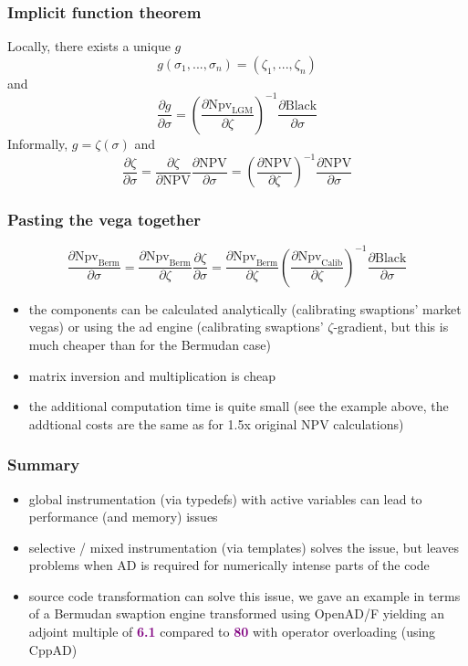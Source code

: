 \documentclass[10pt,German]{beamer}
\begin{document}
\begin{frame}[fragile]
\frametitle{Implicit function theorem}
Locally, there exists a unique $g$
\begin{equation}
g(\sigma_1, ... , \sigma_n) = (\zeta_1, ..., \zeta_n)
\end{equation}
and
\begin{equation}
\frac{\partial g}{\partial \sigma} = \left( \frac{\partial \text{Npv}_{\text{LGM}}}{\partial \zeta} \right) ^ {-1} \frac{\partial \text{Black}}{\partial \sigma}
\end{equation}
Informally, $g = \zeta(\sigma)$ and
\begin{equation}
\frac{\partial \zeta}{\partial \sigma} = \frac{\partial \zeta}{\partial \text{NPV}} \frac{\partial \text{NPV}}{\partial \sigma} = 
\left( \frac{\partial \text{NPV}}{\partial \zeta}\right)^{-1} \frac{\partial \text{NPV}}{\partial \sigma}
\end{equation}
\end{frame}

\begin{frame}[fragile]
\frametitle{Pasting the vega together}
\begin{equation*}
\frac{\partial \text{Npv}_\text{Berm}}{\partial \sigma} = \frac{\partial \text{Npv}_\text{Berm}}{\partial \zeta} \frac{\partial \zeta}{\partial \sigma} = \frac{\partial \text{Npv}_\text{Berm}}{\partial \zeta} \left( \frac{\partial \text{Npv}_\text{Calib}}{\partial \zeta} \right) ^ {-1} \frac{\partial \text{Black}}{\partial \sigma}
\end{equation*}
\begin{itemize}
\item the components can be calculated analytically (calibrating swaptions' market vegas) or using the ad engine (calibrating swaptions' $\zeta$-gradient, but this is much cheaper than for the Bermudan case)
\item matrix inversion and multiplication is cheap
\item the additional computation time is quite small (see the example above, the addtional costs are the same as for 1.5x original NPV calculations)
\end{itemize}
\end{frame}

\begin{frame}[fragile]
\frametitle{Summary}
\begin{itemize}
\item global instrumentation (via typedefs) with active variables can lead to performance (and memory) issues
\item selective / mixed instrumentation (via templates) solves the issue, but leaves problems when AD is required for numerically intense parts of the code
\item source code transformation can solve this issue, we gave an example in terms of a Bermudan swaption engine transformed using OpenAD/F yielding an adjoint multiple of \textbf{\textcolor{purple}{6.1}} compared to \textbf{\textcolor{purple}{80}} with operator overloading (using CppAD)
\end{itemize}
\end{frame}
\end{document}
